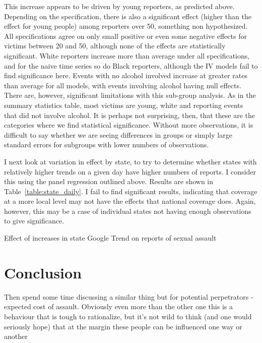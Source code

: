 \documentclass[AER,draftmode]{AEA}
\begin{document}
This increase appears to be driven by young reporters, as predicted above. Depending on the specification, there is also a significant effect (higher than the effect for young people) among reporters over 50, something non hypothesized. All specifications agree on only small positive or even some negative effects for victims between 20 and 50, although none of the effects are statistically significant. White reporters increase more than average under all specifications, and for the naive time series so do Black reporters, although the IV models fail to find significance here. Events with no alcohol involved increase at greater rates than average for all models, with events involving alcohol having null effects. There are, however, significant limitations with this sub-group analysis. As in the summary statistics table, most victims are young, white and reporting events that did not involve alcohol. It is perhaps not surprising, then, that these are the categories where we find statistical significance. Without more observations, it is difficult to say whether we are seeing differences in groups or simply large standard errors for subgroups with lower numbers of observations.

I next look at variation in effect by state, to try to determine whether states with relatively higher trends on a given day have higher numbers of reports.  I consider this using the  panel regression outlined above. Results are shown in Table~\ref{table:state_daily}. I fail to find significant results, indicating that coverage at a more local level may not have the effects that national coverage does. Again, however, this may be a case of individual states not having enough observations to give significance.

\begin{table}[]
\caption{Effect of increases in state Google Trend on reports of sexual assault} \label{table:state_daily}

\end{table}

\clearpage
\section{Conclusion}

Then spend some time discussing a similar thing but for potential perpetrators - expected cost of assault. Obviously even more than the other one this is a behaviour that is tough to rationalize, but it's not wild to think (and one would seriously hope) that at the margin these people can be influenced one way or another
\end{document}
